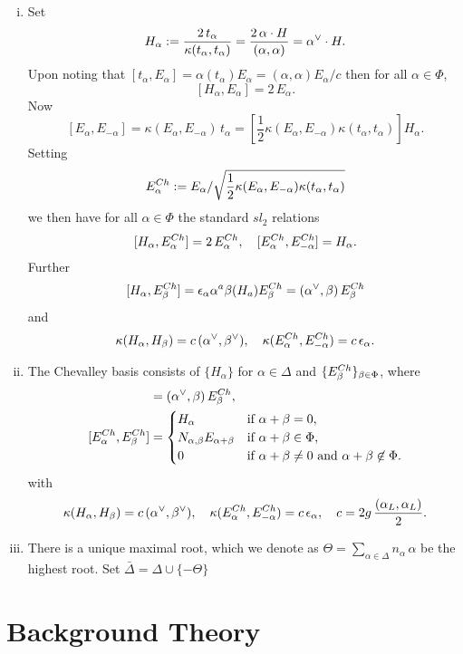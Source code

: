 \documentclass{article}
\begin{document}
\begin{enumerate}[(i)]
	\item Set
	$$H_\alpha:=\frac{2\,t_\alpha}{\kappa(t_\alpha,t_\alpha)}=\frac{2\,\alpha\cdot H}{(\alpha,\alpha)}
	=\alpha\sp\vee\cdot H.
	$$
	Upon noting that $[t_\alpha, E_\alpha]=\alpha(t_\alpha)E_\alpha=(\alpha,\alpha)E_\alpha/{c}$
	then for all $\alpha\in\Phi$,
	$$[H_\alpha, E_\alpha]=2\,E_\alpha.
	$$
	Now
	$$ [E_\alpha,E_{-\alpha}]=\kappa(E_\alpha,E_{-\alpha})\,t_\alpha=
	\left[\frac12 \kappa(E_\alpha,E_{-\alpha}) \kappa(t_\alpha,t_\alpha) \right] H_\alpha.
	$$
	Setting
	$$E_\alpha\sp{Ch}:=E_\alpha/\sqrt{\frac12 \kappa(E_\alpha,E_{-\alpha}) \kappa(t_\alpha,t_\alpha) }$$
	we then have for  all $\alpha\in\Phi$ the standard $sl_2$ relations
	$$[H_\alpha, E_\alpha\sp{Ch}]=2\,E_\alpha\sp{Ch},\quad [E_\alpha\sp{Ch},E_{-\alpha}\sp{Ch}]=H_\alpha.
	$$
	Further
	$$[H_\alpha, E_\beta\sp{Ch}]=\epsilon_\alpha \alpha\sp{a} \beta(H_a) E_\beta\sp{Ch}=
	(\alpha\sp\vee,\beta)\, E_\beta\sp{Ch}
	$$
	and
	$$\kappa(H_\alpha,H_\beta)=c\,(\alpha\sp\vee,\beta\sp\vee),\quad
	\kappa(E_\alpha\sp{Ch},E_{-\alpha}\sp{Ch})=c\,\epsilon_\alpha.
	$$
	
	
	\item The Chevalley basis consists of
	$\{H_\alpha\}$ for $\alpha\in\Delta$ and $\{E_\beta\sp{Ch}\}_{\beta\in\Phi}$, 
	where
	\begin{align*} 
	[H_\alpha, E_\beta\sp{Ch}]&=(\alpha\sp\vee,\beta)\, E_\beta\sp{Ch},\\
	[E_\alpha\sp{Ch},E_\beta\sp{Ch}]&=
	\begin{cases} H_\alpha
	&\text{if }\alpha+\beta=0,\\
	N_{\alpha,\beta}E_{\alpha+\beta}&\text{if }\alpha+\beta\in\Phi,\\
	0&\text{if }\alpha+\beta\ne0\text{ and }\alpha+\beta\not\in\Phi.
	\end{cases}
	\end{align*}
	with
	$$\kappa(H_\alpha,H_\beta)=c\,(\alpha\sp\vee,\beta\sp\vee),\quad
	\kappa(E_\alpha\sp{Ch},E_{-\alpha}\sp{Ch})=c\,\epsilon_\alpha, \quad
	c=2g\, \frac{(\alpha_L,\alpha_L)}{2}.
	$$
	\item There is a unique maximal root, which we denote as $\Theta=\sum_{\alpha\in\Delta} {n_\alpha}\, \alpha$ be the highest root. Set 
	$\bar\Delta=\Delta\cup\{-\Theta\}$
\end{enumerate}
\section{Background Theory}
\end{document}
